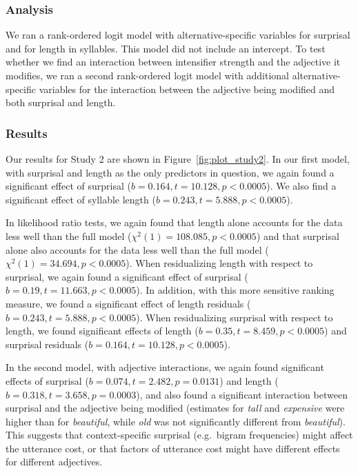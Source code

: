 \documentclass[10pt,letterpaper]{article}
\newcommand{\w}[1]{\emph{#1}}
\begin{document}
\subsubsection{Analysis}

We ran a rank-ordered logit model \cite{beggs_assessing_1981, hausman_specifying_1987} with alternative-specific variables for surprisal and for length in syllables. This model did not include an intercept.
%
To test whether we find an interaction between intensifier strength and the adjective it modifies, we ran a second rank-ordered logit model with additional alternative-specific variables for the interaction between the adjective being modified and both surprisal and length. 

\subsubsection{Results}

Our results for Study 2 are shown in Figure~\ref{fig:plot_study2}. In our first model, with surprisal and length as the only predictors in question, we again found a significant effect of surprisal ($b=0.164,t=10.128,p<0.0005$). We also find a significant effect of syllable length ($b=0.243,t=5.888,p<0.0005$).

In likelihood ratio tests, we again found that length alone accounts for the data less well than the full model ($\chi^2(1)=108.085, p<0.0005$) and that surprisal alone also accounts for the data less well than the full model ($\chi^2(1)=34.694, p<0.0005$).
When residualizing length with respect to surprisal, we again found a significant effect of surprisal ($b=0.19,t=11.663,p<0.0005$). In addition, with this more sensitive ranking measure, we found a significant effect of length residuals ($b=0.243,t=5.888,p<0.0005$).
When residualizing surprisal with respect to length, we found significant effects of length ($b=0.35,t=8.459,p<0.0005$) and surprisal residuals ($b=0.164,t=10.128,p<0.0005$).

In the second model, with adjective interactions, we again found significant effects of surprisal ($b=0.074, t=2.482, p=0.0131$) and length ($b=0.318, t=3.658, p=0.0003$), and also found a significant interaction between surprisal and the adjective being modified (estimates for \w{tall} and \w{expensive} were higher than for \w{beautiful}, while \w{old} was not significantly different from \w{beautiful}).
This suggests that context-specific surprisal (e.g.~bigram frequencies) might affect the utterance cost, or that factors of utterance cost might have different effects for different adjectives.
\end{document}

